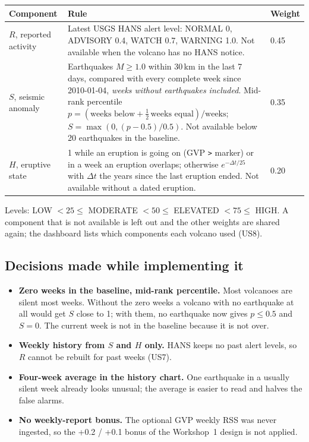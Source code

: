 \documentclass[11pt,a4paper]{article}
\renewcommand{\_}{\textunderscore\allowbreak}
\begin{document}
\begin{longtable}{L{2.4cm}L{9.2cm}L{2.4cm}}
\toprule
\textbf{Component} & \textbf{Rule} & \textbf{Weight}\\
\midrule\endhead
$R$, reported activity & Latest USGS HANS alert level: NORMAL 0, ADVISORY 0.4, WATCH 0.7, WARNING 1.0.
  Not available when the volcano has no HANS notice. & 0.45\\
$S$, seismic anomaly & Earthquakes $M\ge 1.0$ within 30\,km in the last 7 days, compared with every complete
  week since 2010-01-04, \emph{weeks without earthquakes included}. Mid-rank percentile
  $p = (\text{weeks below} + \tfrac12\,\text{weeks equal})/\text{weeks}$; $S=\max(0,(p-0.5)/0.5)$.
  Not available below 20 earthquakes in the baseline. & 0.35\\
$H$, eruptive state & 1 while an eruption is going on (GVP \texttt{>} marker) or in a week an eruption
  overlaps; otherwise $e^{-\Delta t/25}$ with $\Delta t$ the years since the last eruption ended.
  Not available without a dated eruption. & 0.20\\
\bottomrule
\end{longtable}

\noindent Levels: LOW $<25\le$ MODERATE $<50\le$ ELEVATED $<75\le$ HIGH. A component that is not
available is left out and the other weights are shared again; the dashboard lists which components each
volcano used (US8).

\subsection{Decisions made while implementing it}
\begin{itemize}
  \item \textbf{Zero weeks in the baseline, mid-rank percentile.} Most volcanoes are silent most weeks.
        Without the zero weeks a volcano with no earthquake at all would get $S$ close to 1; with them,
        no earthquake now gives $p\le 0.5$ and $S=0$. The current week is not in the baseline because it
        is not over.
  \item \textbf{Weekly history from $S$ and $H$ only.} HANS keeps no past alert levels, so $R$ cannot be
        rebuilt for past weeks (US7).
  \item \textbf{Four-week average in the history chart.} One earthquake in a usually silent week already
        looks unusual; the average is easier to read and halves the false alarms.
  \item \textbf{No weekly-report bonus.} The optional GVP weekly RSS was never ingested, so the
        +0.2 / +0.1 bonus of the Workshop~1 design is not applied.
\end{itemize}
\end{document}
